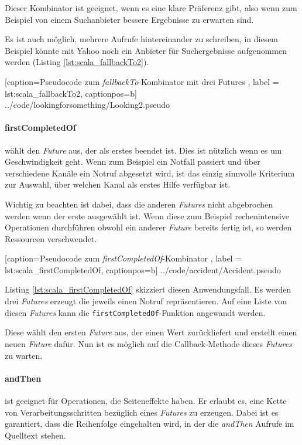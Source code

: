 Dieser Kombinator ist geeignet, wenn es eine klare Präferenz gibt,
also wenn zum Beispiel von einem Suchanbieter bessere Ergebnisse
zu erwarten sind.

Es ist auch möglich, mehrere Aufrufe hintereinander zu schreiben,
in diesem Beispiel könnte mit Yahoo noch ein Anbieter für
Suchergebnisse aufgenommen werden (Listing \ref{lst:scala_fallbackTo2}).


    [caption={Pseudocode zum \emph{fallbackTo}-Kombinator mit drei Futures },
       label = lst:scala_fallbackTo2,
       captionpos=b]
 {../code/lookingforsomething/Looking2.pseudo}

\paragraph{firstCompletedOf} wählt den \emph{Future} aus, der als
erstes beendet ist. Dies ist nützlich wenn es um Geschwindigkeit
geht. Wenn zum Beispiel ein Notfall passiert und über verschiedene
Kanäle ein Notruf abgesetzt wird, ist das einzig sinnvolle Kriterium
zur Auswahl, über welchen Kanal als erstes Hilfe verfügbar ist.

Wichtig zu beachten ist dabei, dass die anderen \emph{Futures}
nicht abgebrochen werden wenn der erste ausgewählt ist. Wenn diese
zum Beispiel rechenintensive Operationen durchführen obwohl ein
anderer \emph{Future} bereits fertig ist, so werden Ressourcen
verschwendet.


    [caption={Pseudocode zum \emph{firstCompletedOf}-Kombinator },
       label = lst:scala_firstCompletedOf,
       captionpos=b]
 {../code/accident/Accident.pseudo}
 
Listing \ref{lst:scala_firstCompletedOf} skizziert diesen
Anwendungsfall. Es werden drei \emph{Futures} erzeugt die jeweils
einen Notruf repräsentieren. Auf eine Liste von diesen \emph{Futures}
kann die \texttt{firstCompletedOf}-Funktion angewandt werden.

Diese wählt den ersten \emph{Future} aus, der einen Wert zurückliefert
und erstellt einen neuen \emph{Future} dafür. Nun ist es möglich
auf die Callback-Methode dieses \emph{Futures} zu warten. 

\paragraph{andThen} ist geeignet für Operationen, die Seiteneffekte
haben. Er erlaubt es, eine Kette von Verarbeitungsschritten bezüglich
eines \emph{Futures} zu erzeugen. Dabei ist es garantiert, dass
die Reihenfolge eingehalten wird, in der die \emph{andThen} Aufrufe
im Quelltext stehen.

